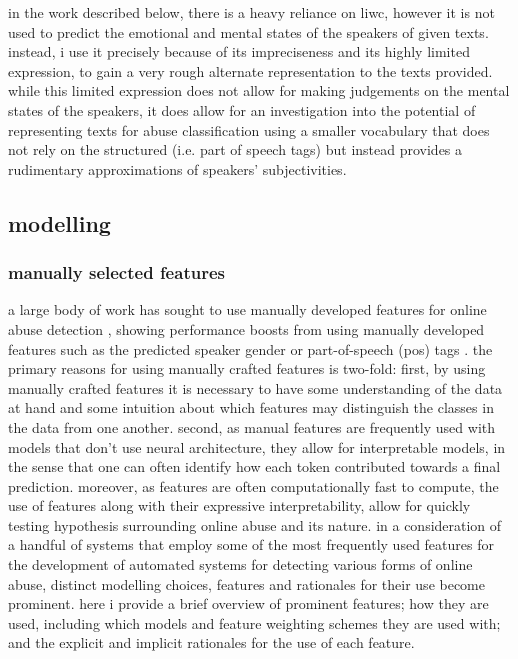 {in the work described below, there is a heavy reliance on liwc, however it is not used to predict the emotional and mental states of the speakers of given texts.
instead, i use it precisely because of its impreciseness and its highly limited expression, to gain a very rough alternate representation to the texts provided.
while this limited expression does not allow for making judgements on the mental states of the speakers, it does allow for an investigation into the potential of representing texts for abuse classification using a smaller vocabulary that does not rely on the structured (i.e. part of speech tags) but instead provides a rudimentary approximations of speakers' subjectivities.
}

\subsection{modelling}
\subsubsection{manually selected features}

a large body of work has sought to use manually developed features for online abuse detection \citep[e.g.]{davidson:2017,waseem:2017,wiegand:2019,fortuna:2018}, showing performance boosts from using manually developed features such as the predicted speaker gender \citep{waseem-hovy:2016} or part-of-speech (pos) tags \citep{davidson:2017}.
the primary reasons for using manually crafted features is two-fold: first, by using manually crafted features it is necessary to have some understanding of the data at hand and some intuition about which features may distinguish the classes in the data from one another. 
second, as manual features are frequently used with models that don't use neural architecture, they allow for interpretable models, in the sense that one can often identify how each token contributed towards a final prediction. 
moreover, as features are often computationally fast to compute, the use of features along with their expressive interpretability, allow for quickly testing hypothesis surrounding online abuse and its nature.
in a consideration of a handful of systems that employ some of the most frequently used features for the development of automated systems for detecting various forms of online abuse, distinct modelling choices, features and rationales for their use become prominent.
here i provide a brief overview of prominent features; how they are used, including which models and feature weighting schemes they are used with; and the explicit and implicit rationales for the use of each feature.

